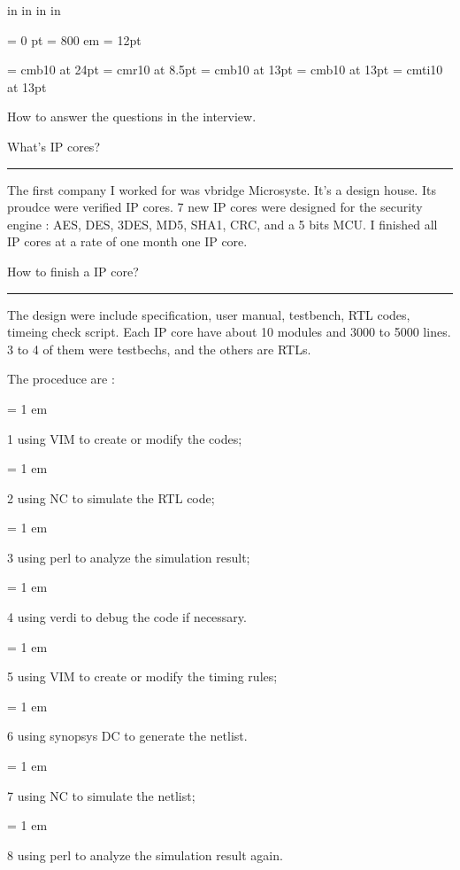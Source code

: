  in     %
 in    %
 in  %
 in  %


\nopagenumbers

\parindent = 0 pt
\emergencystretch = 800 em
\baselineskip = 12pt


\font\FFaa=      cmb10            at 24pt
\font\FFbb=      cmr10            at 8.5pt
\font\FFcc=      cmb10            at 13pt
\font\FFdd=      cmb10            at 13pt
\font\FFee=      cmti10           at 13pt


\bigbreak

\centerline{ \FFaa
How to answer the questions in the interview.
}

{ \medbreak } { \FFcc
What's IP cores?
} { \smallbreak } {\par\noindent\hrule} { \smallbreak }

    The first company I worked for was vbridge Microsyste.
It's a design house. Its proudce were verified IP cores.
7 new IP cores were designed for the security engine : 
AES, DES, 3DES, MD5, SHA1, CRC, and a 5 bits MCU.
I finished all IP cores at a rate of one month one IP core.

{ \medbreak } { \FFcc
How to finish a IP core?
} { \smallbreak } {\par\noindent\hrule} { \smallbreak }
The design were include specification, user manual, testbench, 
RTL codes, timeing check script. 
Each IP core have about 10 modules and 3000 to 5000 lines.
3 to 4 of them were testbechs, and the others are RTLs.

The proceduce are : 

{ \parindent = 1 em \item{1} 
using VIM to create or modify the codes;
}
{ \parindent = 1 em \item{2} 
using NC to simulate the RTL code;
}
{ \parindent = 1 em \item{3} 
using perl to analyze the simulation result;
}
{ \parindent = 1 em \item{4} 
using verdi to debug the code if necessary.
}
{ \parindent = 1 em \item{5} 
using VIM to create or modify the timing rules;
}
{ \parindent = 1 em \item{6} 
using synopsys DC to generate the netlist.
}
{ \parindent = 1 em \item{7} 
using NC to simulate the netlist;
}
{ \parindent = 1 em \item{8} 
using perl to analyze the simulation result again.
}


